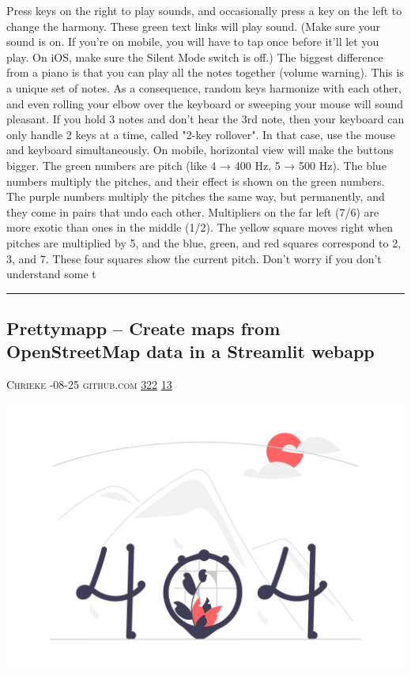 \documentclass[10pt,a4paper]{article}
\begin{document}
\begin{multicols*}{2}
Press keys on the right to play sounds, and occasionally press a key on the left to change the harmony. These green text links will play sound. (Make sure your sound is on. If you're on mobile, you will have to tap once before it'll let you play. On iOS, make sure the Silent Mode switch is off.)
The biggest difference from a piano is that you can play all the notes together (volume warning). This is a unique set of notes. As a consequence, random keys harmonize with each other, and even rolling your elbow over the keyboard or sweeping your mouse will sound pleasant. If you hold 3 notes and don't hear the 3rd note, then your keyboard can only handle 2 keys at a time, called "2-key rollover". In that case, use the mouse and keyboard simultaneously. On mobile, horizontal view will make the buttons bigger.
The green numbers are pitch (like 4 → 400 Hz, 5 → 500 Hz). The blue numbers multiply the pitches, and their effect is shown on the green numbers. The purple numbers multiply the pitches the same way, but permanently, and they come in pairs that undo each other. Multipliers on the far left (7/6) are more exotic than ones in the middle (1/2). The yellow square moves right when pitches are multiplied by 5, and the blue, green, and red squares correspond to 2, 3, and 7. These four squares show the current pitch.
Don't worry if you don't understand some t
\par\noindent\textcolor{red}{\rule{\linewidth}{0.2mm}}
\vfill
\null
\noindent\begin{minipage}{\linewidth}
\subsection{Prettymapp – Create maps from OpenStreetMap data in a Streamlit webapp}
\textsc{\footnotesize
{\scriptsize\faUser}\space 
Chrieke 
{\scriptsize\faCalendar}-08-25 
{\scriptsize\faGithub}\space 
github.com 
{\scriptsize\faThumbsOUp}\space 
\href{http://news.ycombinator.com/item?id=37222823\&utm\_term=comment}{322} 
{\scriptsize\faComments}\space 
\href{http://news.ycombinator.com/item?id=37222823\&utm\_term=comment}{13} 
}
\par\medskip\noindent
\href{https://github.com/chrieke/prettymapp?utm\_source=hackernewsletter\&utm\_medium=email\&utm\_term=show\_hn}{
    \includegraphics[width=0.99\linewidth]{notfound.png}
}
\end{minipage}

\end{multicols*}
\end{document}
